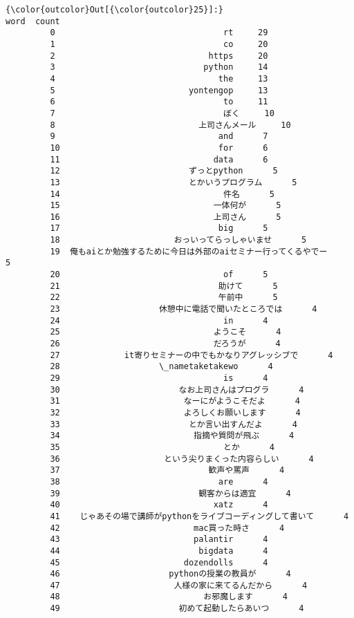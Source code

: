 \documentclass[11pt]{article}
\begin{document}
\begin{Verbatim}[commandchars=\\\{\}]
{\color{outcolor}Out[{\color{outcolor}25}]:}                                  word  count
         0                                  rt     29
         1                                  co     20
         2                               https     20
         3                              python     14
         4                                 the     13
         5                           yontengop     13
         6                                  to     11
         7                                  ぼく     10
         8                             上司さんメール     10
         9                                 and      7
         10                                for      6
         11                               data      6
         12                          ずっとpython      5
         13                          とかいうプログラム      5
         14                                 件名      5
         15                               一体何が      5
         16                               上司さん      5
         17                                big      5
         18                       おっいってらっしゃいませ      5
         19  俺もaiとか勉強するために今日は外部のaiセミナー行ってくるやでー      5
         20                                 of      5
         21                                助けて      5
         22                                午前中      5
         23                    休憩中に電話で聞いたところでは      4
         24                                 in      4
         25                               ようこそ      4
         26                               だろうが      4
         27             it寄りセミナーの中でもかなりアグレッシブで      4
         28                    \_nametaketakewo      4
         29                                 is      4
         30                        なお上司さんはプログラ      4
         31                         なーにがようこそだよ      4
         32                         よろしくお願いします      4
         33                          とか言い出すんだよ      4
         34                           指摘や質問が飛ぶ      4
         35                                 とか      4
         36                     という尖りまくった内容らしい      4
         37                              歓声や罵声      4
         38                                are      4
         39                            観客からは適宜      4
         40                               xatz      4
         41    じゃあその場で講師がpythonをライブコーディングして書いて      4
         42                           mac買った時さ      4
         43                           palantir      4
         44                            bigdata      4
         45                         dozendolls      4
         46                      pythonの授業の教員が      4
         47                       人様の家に来てるんだから      4
         48                             お邪魔します      4
         49                        初めて起動したらあいつ      4
\end{Verbatim}
            
\end{document}
